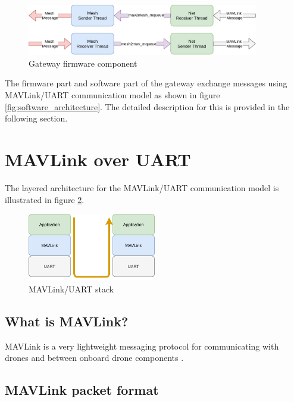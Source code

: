 \documentclass[\main/main.tex]{subfiles}
\begin{document}
\begin{figure}[H]
    \begin{center}
        \includegraphics[width=0.9\textwidth]{gateway_firmware.png}
    \end{center}
    \caption{Gateway firmware component}
    \label{fig:gateway_firmware}
\end{figure}

The firmware part and software part of the gateway exchange messages using MAVLink/UART communication model as shown in figure \ref{fig:software_architecture}. The detailed description for this is provided in the following section.

\section{MAVLink over UART}
The layered architecture for the MAVLink/UART communication model is illustrated in figure \ref{fig:mavlink_uart_stack}.
\begin{figure}[H]
    \begin{center}
        \includegraphics[width=0.5\textwidth]{MAVLink_over_UART.png}
    \end{center}
    \caption{MAVLink/UART stack}
    \label{fig:mavlink_uart_stack}
\end{figure}

\subsection{What is MAVLink?}
MAVLink is a very lightweight messaging protocol for communicating with drones and between onboard drone components \cite{web_mavlink}.

\subsection{MAVLink packet format}
\end{document}
